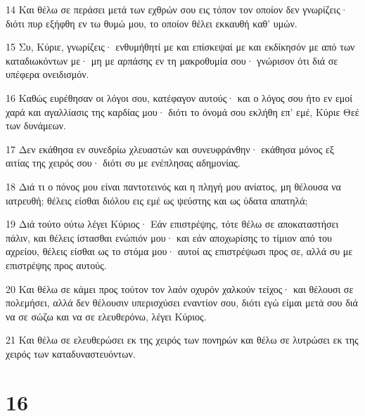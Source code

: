 \par 14 Και θέλω σε περάσει μετά των εχθρών σου εις τόπον τον οποίον δεν γνωρίζεις· διότι πυρ εξήφθη εν τω θυμώ μου, το οποίον θέλει εκκαυθή καθ' υμών.
\par 15 Συ, Κύριε, γνωρίζεις· ενθυμήθητί με και επίσκεψαί με και εκδίκησόν με από των καταδιωκόντων με· μη με αρπάσης εν τη μακροθυμία σου· γνώρισον ότι διά σε υπέφερα ονειδισμόν.
\par 16 Καθώς ευρέθησαν οι λόγοι σου, κατέφαγον αυτούς· και ο λόγος σου ήτο εν εμοί χαρά και αγαλλίασις της καρδίας μου· διότι το όνομά σου εκλήθη επ' εμέ, Κύριε Θεέ των δυνάμεων.
\par 17 Δεν εκάθησα εν συνεδρίω χλευαστών και συνευφράνθην· εκάθησα μόνος εξ αιτίας της χειρός σου· διότι συ με ενέπλησας αδημονίας.
\par 18 Διά τι ο πόνος μου είναι παντοτεινός και η πληγή μου ανίατος, μη θέλουσα να ιατρευθή; θέλεις είσθαι διόλου εις εμέ ως ψεύστης και ως ύδατα απατηλά;
\par 19 Διά τούτο ούτω λέγει Κύριος· Εάν επιστρέψης, τότε θέλω σε αποκαταστήσει πάλιν, και θέλεις ίστασθαι ενώπιόν μου· και εάν αποχωρίσης το τίμιον από του αχρείου, θέλεις είσθαι ως το στόμα μου· αυτοί ας επιστρέψωσι προς σε, αλλά συ με επιστρέψης προς αυτούς.
\par 20 Και θέλω σε κάμει προς τούτον τον λαόν οχυρόν χαλκούν τείχος· και θέλουσι σε πολεμήσει, αλλά δεν θέλουσιν υπερισχύσει εναντίον σου, διότι εγώ είμαι μετά σου διά να σε σώζω και να σε ελευθερόνω, λέγει Κύριος.
\par 21 Και θέλω σε ελευθερώσει εκ της χειρός των πονηρών και θέλω σε λυτρώσει εκ της χειρός των καταδυναστευόντων.

\chapter{16}

